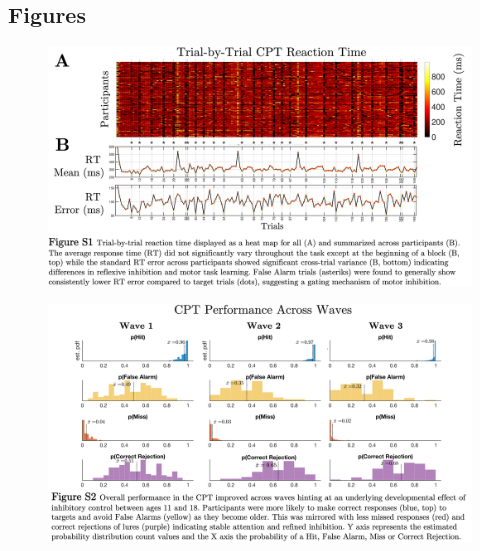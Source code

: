 \documentclass[utf8]{suppmat} %
\begin{document}

\subsection{Figures}


\begin{figure}[htbp]
\begin{center}
\includegraphics[width=\textwidth,height=\textheight,keepaspectratio]{Fig-S1}%
\end{center}
\end{figure}

\begin{figure}[htbp]
\begin{center}
\includegraphics[width=\textwidth,height=\textheight,keepaspectratio]{Fig-S2}%
\end{center}
\end{figure}
\end{document}
